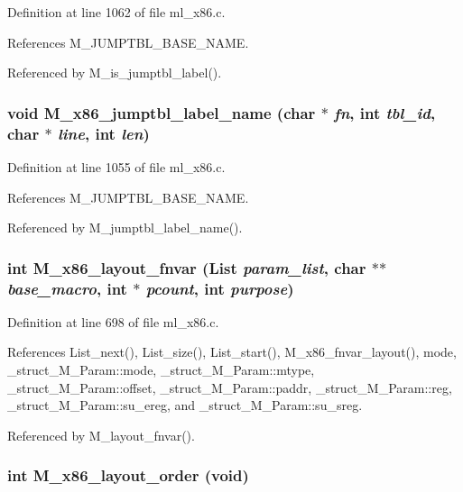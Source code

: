 Definition at line 1062 of file ml\_\-x86.c.

References M\_\-JUMPTBL\_\-BASE\_\-NAME.

Referenced by M\_\-is\_\-jumptbl\_\-label().
\subsubsection{\setlength{\rightskip}{0pt plus 5cm}void M\_\-x86\_\-jumptbl\_\-label\_\-name (char $\ast$ {\em fn}, int {\em tbl\_\-id}, char $\ast$ {\em line}, int {\em len})}\label{m__x86_8h_4086f964a0c1e87878b6a60ea52c1540}




Definition at line 1055 of file ml\_\-x86.c.

References M\_\-JUMPTBL\_\-BASE\_\-NAME.

Referenced by M\_\-jumptbl\_\-label\_\-name().
\subsubsection{\setlength{\rightskip}{0pt plus 5cm}int M\_\-x86\_\-layout\_\-fnvar (\bf{List} {\em param\_\-list}, char $\ast$$\ast$ {\em base\_\-macro}, int $\ast$ {\em pcount}, int {\em purpose})}\label{m__x86_8h_a4e0ea0d585095df7ec5435f5d640656}




Definition at line 698 of file ml\_\-x86.c.

References List\_\-next(), List\_\-size(), List\_\-start(), M\_\-x86\_\-fnvar\_\-layout(), mode, \_\-struct\_\-M\_\-Param::mode, \_\-struct\_\-M\_\-Param::mtype, \_\-struct\_\-M\_\-Param::offset, \_\-struct\_\-M\_\-Param::paddr, \_\-struct\_\-M\_\-Param::reg, \_\-struct\_\-M\_\-Param::su\_\-ereg, and \_\-struct\_\-M\_\-Param::su\_\-sreg.

Referenced by M\_\-layout\_\-fnvar().
\subsubsection{\setlength{\rightskip}{0pt plus 5cm}int M\_\-x86\_\-layout\_\-order (void)}\label{m__x86_8h_e57becf5b70251b6e50db8171352073d}




